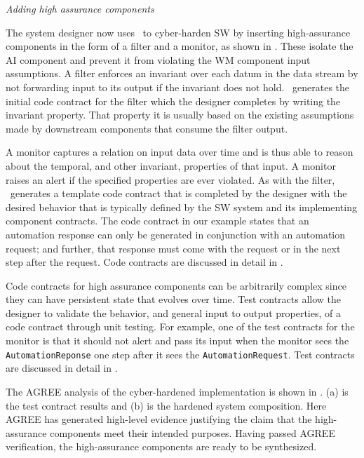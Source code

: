 \emph{Adding high assurance components}

The system designer now uses \brfcs\ to cyber-harden SW by inserting
high-assurance components in the form of a filter and a monitor, as
shown in .
These isolate the AI component and prevent it from violating the WM component input assumptions.
A filter enforces an invariant over
each datum in the data stream by not forwarding input to its output if the invariant does not hold.
\brfcs\ generates the initial code contract for the filter which the designer completes by writing the invariant property.
That property it is usually based on the existing assumptions made by
downstream components that consume the filter output.

A monitor captures a relation on input data over time and is thus able
to reason about the temporal, and other invariant, properties of that input.  A monitor raises
an alert if the specified properties are ever violated.  
As with the filter, \brfcs\ generates a template code contract that is completed by the designer with the desired behavior that is typically defined by the SW system and its implementing component contracts. 
The code contract in our example states that an
automation response can only be generated in conjunction with an
automation request; and further, that response must come with the
request or in the next step after the request.  
Code contracts are discussed in detail in .

Code contracts for high assurance components can be arbitrarily complex since they can have persistent state that evolves over time.
Test contracts allow the designer to validate the behavior, and general input to output properties, of a code contract through unit testing.
For example, one of the test contracts for the monitor is that it should not alert and pass its input when the monitor sees the \texttt{AutomationReponse} one step after it sees the \texttt{AutomationRequest}.
Test contracts are discussed in detail in .

The AGREE analysis of the cyber-hardened implementation is shown in
.
(a) is the test contract results and (b) is the hardened system composition.
Here AGREE has generated high-level
evidence justifying the claim that the high-assurance components meet their intended purposes.
Having passed AGREE verification, the high-assurance components are ready to be
synthesized.

